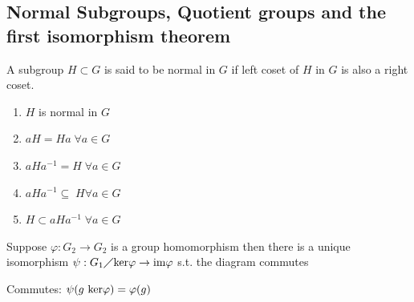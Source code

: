 \subsection{Normal Subgroups, Quotient groups and the first isomorphism theorem}

\begin{definition}
    A subgroup $H \subset G$ is said to be normal in $G$ if left coset of $H$ in $G$ is also a right coset.
\end{definition}


\begin{proposition}
        \phantom{text}
      \begin{enumerate}
          \item $H$ is normal in $G$
          \item $aH=Ha\; \forall a \in G$
          \item $aHa^{-1}=H\; \forall a \in G$
          \item $aHa^{-1}\subseteq\; H \forall a\in G$
          \item $H \subset aHa^{-1}\; \forall a \in G$
      \end{enumerate}
\end{proposition}

\begin{theorem}
    Suppose $\varphi: G_2 \rightarrow G_2$ is a group homomorphism
    then there is a unique isomorphism 
    $\psi: G_1\diagup \text{ker}\varphi \rightarrow \text{im}\varphi$ s.t. the diagram commutes
    \begin{center}
    \end{center}

    Commutes: $\psi(g\text{ ker}\varphi)=\varphi(g)$
\end{theorem}
